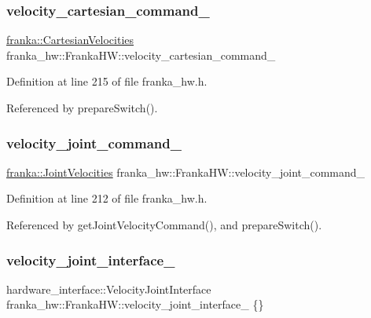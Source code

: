 \subsubsection{\texorpdfstring{velocity\+\_\+cartesian\+\_\+command\+\_\+}{velocity\_cartesian\_command\_}}
{\footnotesize\ttfamily \hyperlink{classfranka_1_1CartesianVelocities}{franka\+::\+Cartesian\+Velocities} franka\+\_\+hw\+::\+Franka\+H\+W\+::velocity\+\_\+cartesian\+\_\+command\+\_\+\hspace{0.3cm}{\ttfamily [private]}}



Definition at line 215 of file franka\+\_\+hw.\+h.



Referenced by prepare\+Switch().

\mbox{\label{classfranka__hw_1_1FrankaHW_ae25ff898759d1f0c9a34c873cadd8e01}} 
\subsubsection{\texorpdfstring{velocity\+\_\+joint\+\_\+command\+\_\+}{velocity\_joint\_command\_}}
{\footnotesize\ttfamily \hyperlink{classfranka_1_1JointVelocities}{franka\+::\+Joint\+Velocities} franka\+\_\+hw\+::\+Franka\+H\+W\+::velocity\+\_\+joint\+\_\+command\+\_\+\hspace{0.3cm}{\ttfamily [private]}}



Definition at line 212 of file franka\+\_\+hw.\+h.



Referenced by get\+Joint\+Velocity\+Command(), and prepare\+Switch().

\mbox{\label{classfranka__hw_1_1FrankaHW_aae00e8f592019644703aaebcc8b6d8db}} 
\subsubsection{\texorpdfstring{velocity\+\_\+joint\+\_\+interface\+\_\+}{velocity\_joint\_interface\_}}
{\footnotesize\ttfamily hardware\+\_\+interface\+::\+Velocity\+Joint\+Interface franka\+\_\+hw\+::\+Franka\+H\+W\+::velocity\+\_\+joint\+\_\+interface\+\_\+ \{\}\hspace{0.3cm}{\ttfamily [private]}}



